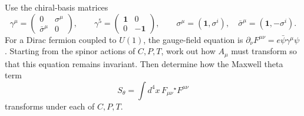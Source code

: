 Use the chiral-basis matrices
\begin{equation}
    \gamma^\mu=\begin{pmatrix}0&\sigma^\mu\\
    \bar\sigma^\mu&0\end{pmatrix},
    \qquad
    \gamma^5=\begin{pmatrix}\mathbf1&0\\0&-\mathbf1\end{pmatrix},
    \qquad
    \sigma^\mu=(\mathbf1,\sigma^i),\quad
    \bar\sigma^\mu=(\mathbf1,-\sigma^i).
\end{equation}
For a Dirac fermion coupled to $U(1)$, the gauge-field equation is
$\partial_\nu F^{\mu\nu}=e\bar\psi\gamma^\mu\psi$.
Starting from the spinor actions of $C,P,T$, work out how $A_\mu$
must transform so that this equation remains invariant. Then determine
how the Maxwell theta term
\begin{equation}
    S_\theta=\int d^4x\,F_{\mu\nu}{}^\star F^{\mu\nu}
\end{equation}
transforms under each of $C,P,T$.
